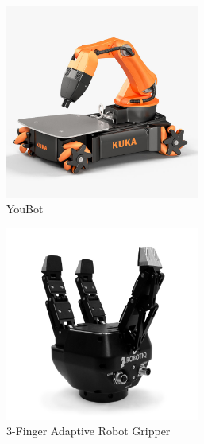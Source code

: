 \begin{figure}
    \centering
    \begin{subfigure}{.3\linewidth}
        \centering
        \includegraphics[width=0.7\textwidth]{Images/kuka-youbot-3D-model_0.jpg}
        \caption{YouBot}
        \label{fig:YouBot}
    \end{subfigure}
    \begin{subfigure}{.3\linewidth}
        \centering
        \includegraphics[width=0.7\textwidth]{Images/3-finger-robot-gripper-robotiq.jpg}
        \caption{3-Finger Adaptive Robot Gripper}
        \label{lbel:Robotiq3Finger}
    \end{subfigure}
    \begin{subfigure}{.3\linewidth}
        \centering

\end{subfigure}
\end{figure}
